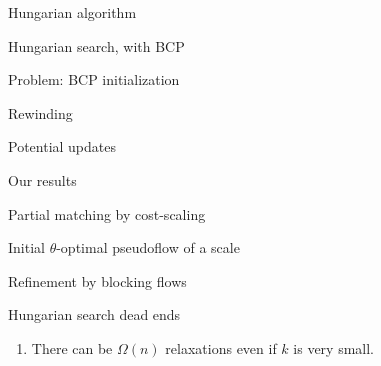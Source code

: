 \documentclass[xcolor={dvipsnames,usenames}]{beamer}
\newcommand{\eps}{\varepsilon}
\begin{document}

\begin{frame}{Hungarian algorithm}
\end{frame}

\begin{frame}{Hungarian search, with BCP}
\end{frame}

\begin{frame}{Problem: BCP initialization}
\end{frame}

\begin{frame}{Rewinding}
\end{frame}

\begin{frame}{Potential updates}
\end{frame}


\begin{frame}{Our results}
\end{frame}

\begin{frame}{Partial matching by cost-scaling}
\end{frame}

\begin{frame}{Initial $\theta$-optimal pseudoflow of a scale}
\end{frame}

\begin{frame}{Refinement by blocking flows}
\end{frame}

\begin{frame}{Hungarian search dead ends}
\begin{enumerate}
\item There can be $\Omega(n)$ relaxations even if $k$ is very small.
\end{enumerate}
\end{frame}
\end{document}
